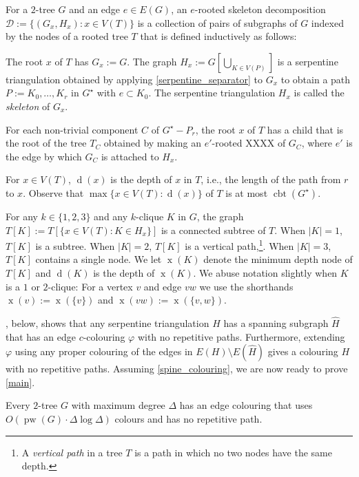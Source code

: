 \documentclass[kpfonts]{patmorin}
\DeclareMathOperator{\pw}{pw}
\DeclareMathOperator{\x}{x}
\DeclareMathOperator{\depth}{d}
\DeclareMathOperator{\cbt}{cbt}
\begin{document}
For a $2$-tree $G$ and an edge $e\in E(G)$, an $e$-rooted skeleton decomposition $\mathcal{D}:=\{(G_x,H_x):x\in V(T)\}$ is a collection of pairs of subgraphs of $G$ indexed by the nodes of a rooted tree $T$ that is defined inductively as follows:
\begin{compactenum}
    \item The root $x$ of $T$ has $G_x:=G$.  The graph $H_x:=G[\bigcup_{K\in V(P)}]$ is a serpentine triangulation obtained by applying \cref{serpentine_separator} to $G_x$ to obtain a path $P:=K_0,\ldots,K_r$ in $G^\star$ with $e\subset K_0$.  The serpentine triangulation $H_x$ is called the \emph{skeleton} of $G_x$.
    \item For each non-trivial component $C$ of $G^\star-P_r$, the root $x$ of $T$ has a child that is the root of the tree $T_C$ obtained by making an $e'$-rooted XXXX of $G_C$, where $e'$ is the edge by which $G_C$ is attached to $H_x$.
\end{compactenum}
For $x\in V(T)$, $\depth(x)$ is the depth of $x$ in $T$, i.e., the length of the path from $r$ to $x$. Observe that $\max\{x\in V(T):\depth(x)\}$ of $T$ is at most $\cbt(G^\star)$.

For any $k\in\{1,2,3\}$ and any $k$-clique $K$ in $G$, the graph $T[K]:=T[\{x\in V(T):K\in H_x\}]$ is a connected subtree of $T$.  When $|K|=1$, $T[K]$ is a subtree.  When $|K|=2$, $T[K]$ is a vertical path,\footnote{A \emph{vertical path} in a tree $T$ is a path in which no two nodes have the same depth.}.  When $|K|=3$, $T[K]$ contains a single node.  We let $\x(K)$ denote the minimum depth node of $T[K]$ and $\depth(K)$ is the depth of $\x(K)$. We abuse notation slightly when $K$ is a $1$ or $2$-clique:  For a vertex $v$ and edge $vw$ we use the shorthands $\x(v):=\x(\{v\})$ and $\x(vw):=\x(\{v,w\})$.

, below, shows that any serpentine triangulation $H$ has a spanning subgraph $\hat{H}$ that has an edge $c$-colouring $\varphi$ with no repetitive paths.  Furthermore, extending $\varphi$ using any proper colouring of the edges in $E(H)\setminus E(\hat{H})$ gives a colouring $H$ with no repetitive paths. Assuming \cref{spine_colouring}, we are now ready to prove \cref{main}.

\begin{thm}
    Every $2$-tree $G$ with maximum degree $\Delta$ has an edge colouring that uses $O(\pw(G)\cdot\Delta\log\Delta)$ colours and has no repetitive path.
\end{thm}
\end{document}
